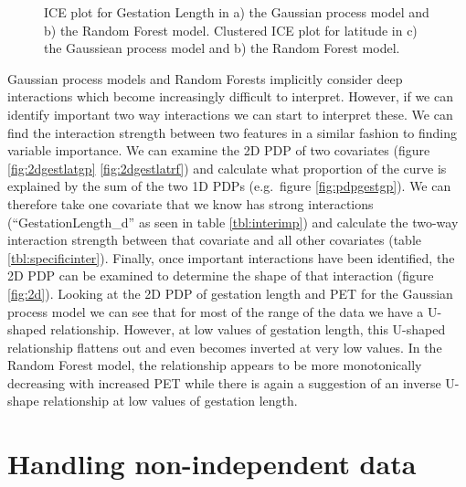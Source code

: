 \documentclass[10pt,]{article}
\begin{document}
\begin{figure}[t!]
  \centering


  \label{fig:ice}
  \caption{
    ICE plot for Gestation Length in a) the Gaussian process model and b) the Random Forest model. 
    Clustered ICE plot for latitude in c) the Gaussiean process model and b) the Random Forest model.
  }
\end{figure}


Gaussian process models and Random Forests implicitly consider deep interactions which become increasingly difficult to interpret.
However, if we can identify important two way interactions we can start to interpret these.
We can find the interaction strength between two features in a similar fashion to finding variable importance.
We can examine the 2D PDP of two covariates (figure \ref{fig:2dgestlatgp} \ref{fig:2dgestlatrf}) and calculate what proportion of the curve is explained by the sum of the two 1D PDPs (e.g.~figure \ref{fig:pdpgestgp}).
We can therefore take one covariate that we know has strong interactions (``GestationLength\_d'' as seen in table \ref{tbl:interimp}) and calculate the two-way interaction strength between that covariate and all other covariates (table \ref{tbl:specificinter}).
Finally, once important interactions have been identified, the 2D PDP can be examined to determine the shape of that interaction (figure \ref{fig:2d}).
Looking at the 2D PDP of gestation length and PET for the Gaussian process model we can see that for most of the range of the data we have a U-shaped relationship.
However, at low values of gestation length, this U-shaped relationship flattens out and even becomes inverted at very low values.
In the Random Forest model, the relationship appears to be more monotonically decreasing with increased PET while there is again a suggestion of an inverse U-shape relationship at low values of gestation length.



\section{Handling non-independent data}\label{handling-non-independent-data}
\end{document}
